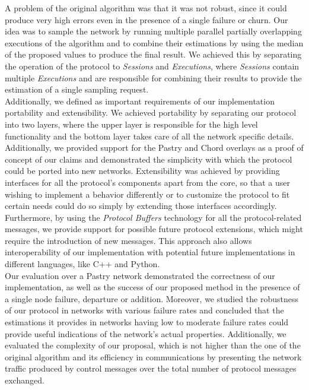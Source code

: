 \documentclass[a4paper,11pt,twoside]{report}
\begin{document}
A problem of the original algorithm was that it was not robust, since it could produce very high errors even in the presence of a single failure or churn. Our idea was to sample the network by running multiple parallel partially overlapping executions of the algorithm and to combine their estimations by using the median of the proposed values to produce the final result. We achieved this by separating the operation of the protocol to \textit{Sessions} and \textit{Executions}, where \textit{Sessions} contain multiple \textit{Executions} and are responsible for combining their results to provide the estimation of a single sampling request.\\

Additionally, we defined as important requirements of our implementation portability and extensibility. We achieved portability by separating our protocol into two layers, where the upper layer is responsible for the high level functionality and the bottom layer takes care of all the network specific details. Additionally, we provided support for the Pastry and Chord overlays as a proof of concept of our claims and demonstrated the simplicity with which the protocol could be ported into new networks. Extensibility was achieved by providing interfaces for all the protocol's components apart from the core, so that a user wishing to implement a behavior differently or to customize the protocol to fit certain needs could do so simply by extending those interfaces accordingly. Furthermore, by using the \textit{Protocol Buffers} technology for all the protocol-related messages, we provide support for possible future protocol extensions, which might require the introduction of new messages. This approach also allows interoperability of our implementation with potential future implementations in different languages, like C++ and Python.\\

Our evaluation over a Pastry network demonstrated the correctness of our implementation, as well as the success of our proposed method in the presence of a single node failure, departure or addition.  Moreover, we studied the robustness of our protocol in networks with various failure rates and concluded that the estimations it provides in networks having low to moderate failure rates could provide useful indications of the network's actual properties. Additionally, we evaluated the complexity of our proposal, which is not higher than the one of the original algorithm and its efficiency in communications by presenting the network traffic produced by control messages over the total number of protocol messages exchanged.\\
\end{document}
